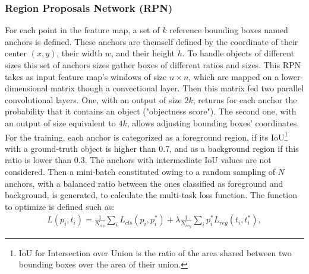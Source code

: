 \documentclass[12pt, french, a4paper]{article} %
\begin{document}
\subsubsection{Region Proposals Network (RPN)}
For each point in the feature map, a set of $k$ reference bounding boxes named anchors is defined. These anchors are themself defined by the coordinate of their center $(x,y)$, their width $w$, and their height $h$. To handle objects of different sizes this set of anchors sizes gather boxes of different ratios and sizes. This \gls{RPN} takes as input feature map's windows of size $n\times n$, which are mapped on a lower-dimensional matrix though a convectional layer. Then this matrix fed two parallel convolutional layers. One, with an output of size $2k$, returns for each anchor the probability that it contains an object ("objectness score"). The second one, with an output of size equivalent to $4k$, allows adjusting bounding boxes' coordinates.\\
For the training, each anchor is categorized as a foreground region, if its \gls{IoU}\footnote{\gls{IoU} for Intersection over Union is the ratio of the area shared between two bounding boxes over the area of their union. } with a ground-truth object is higher than 0.7, and as a background region if this ratio is lower than 0.3. The anchors with intermediate \gls{IoU} values are not considered. Then a mini-batch constituted owing to a random sampling of $N$ anchors, with a balanced ratio between the ones classified as foreground and background, is generated, to calculate the multi-task loss function. The function to optimize is defined such as:
\begin{align}
 L({p_i}, {t_i}) = \frac{1}{N_{cls}} \sum_i L_{cls}(p_i, p_i^*) + \lambda \frac{1}{N_{reg}} \sum_i p_i^* L_{reg}(t_i, t_i^*),
 \label{Eq1}
\end{align}
\end{document}

